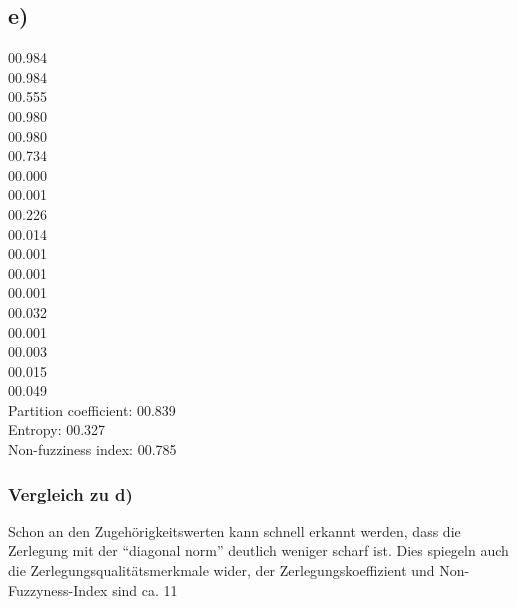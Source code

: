 \subsection*{e)}

00.984	\\
00.984	\\
00.555	\\
00.980	\\
00.980	\\
00.734	\\
00.000	\\
00.001	\\
00.226	\\
00.014	\\
00.001	\\
00.001	\\
00.001	\\
00.032	\\
00.001	\\
00.003	\\
00.015	\\
00.049  \\

Partition coefficient:	00.839\\
Entropy:		00.327\\
Non-fuzziness index:	00.785

\subsubsection*{Vergleich zu d)}

Schon an den Zugehörigkeitswerten kann schnell erkannt werden, dass die Zerlegung mit der "`diagonal norm"' deutlich weniger scharf ist. Dies spiegeln auch die Zerlegungsqualitätsmerkmale wider, der Zerlegungskoeffizient und Non-Fuzzyness-Index sind ca. 11\ %
